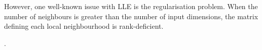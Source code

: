 \documentclass[journal, a4paper]{IEEEtran}
\begin{document}
However, one well-known issue with LLE is the regularisation problem. When the number of neighbours is greater than the number of input dimensions, the matrix defining each local neighbourhood is rank-deficient. 

%


.
\end{document}
